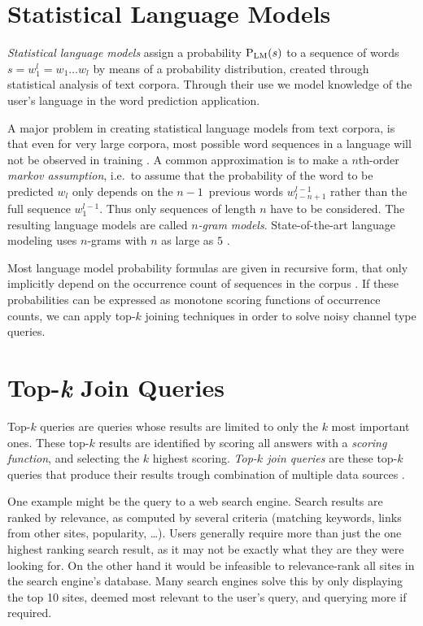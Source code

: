 \section{Statistical Language Models}
\label{sec:introduction-langmodels}

\emph{Statistical language models} assign a probability $\Prob[\text{LM}]{s}$ to
a sequence of words $s = w_1^l = w_1 \ldots w_l$ by means of a probability
distribution, created through statistical analysis of text corpora.
Through their use we model knowledge of the user's language in the word
prediction application.

A major problem in creating statistical language models from text corpora, is
that even for very large corpora, most possible word sequences in a language
will not be observed in training \noref.
A common approximation is to make a $n$th-order \emph{markov assumption},
i.e.\ to assume that the probability of the word to be predicted $w_l$ only
depends on the $n\!-\!1$~previous words $w_{l-n+1}^{l-1}$ rather than the full
sequence $w_1^{l-1}$.
Thus only sequences of length $n$ have to be considered.
The resulting language models are called \emph{$n$-gram models}.
State-of-the-art language modeling uses $n$-grams with $n$ as large as $5$
\parencite{JurafskyMartin2009,Goodman2001,Stolcke2000}.

Most language model probability formulas are given in recursive form, that only
implicitly depend on the occurrence count of sequences in the corpus \noref.
If these probabilities can be expressed as monotone scoring functions of
occurrence counts, we can apply top-$k$ joining techniques in order to solve
noisy channel type queries.


\section{Top-\emph{k} Join Queries}
\label{sec:introduction-topkjoin}

Top-$k$ queries are queries whose results are limited to only the $k$ most
important ones.
These top-$k$ results are identified by scoring all answers with a
\emph{scoring function}, and selecting the $k$ highest scoring.
\emph{Top-$k$ join queries} are these top-$k$ queries that produce
their results trough combination of multiple data sources \parencite{Ilyas2008}.

One example might be the query to a web search engine.
Search results are ranked by relevance, as computed by several criteria
(matching keywords, links from other sites, popularity, \ldots).
Users generally require more than just the one highest ranking search result, as
it may not be exactly what they are they were looking for.
On the other hand it would be infeasible to relevance-rank all sites in the
search engine's database.
Many search engines solve this by only displaying the top 10 sites, deemed most
relevant to the user's query, and querying more if required.

